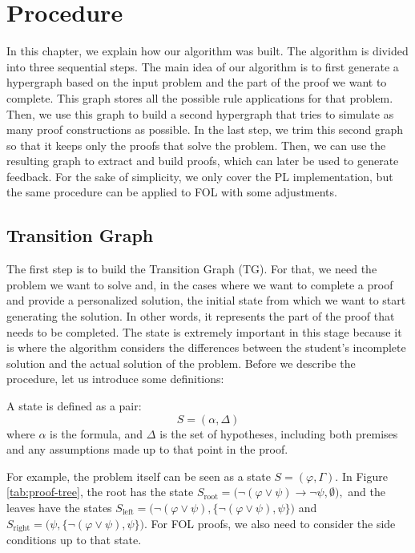 \documentclass[runningheads]{llncs}
\begin{document}
\section{Procedure}
In this chapter, we explain how our algorithm was built. The algorithm is divided into three sequential steps. 
The main idea of our algorithm is to first generate a hypergraph based on the input problem and the part of the proof we want to complete. This graph stores all the possible rule applications for that problem. Then, we use this graph to build a second hypergraph that tries to simulate as many proof constructions as possible. In the last step, we trim this second graph so that it keeps only the proofs that solve the problem. Then, we can use the resulting graph to extract and build proofs, which can later be used to generate feedback. For the sake of simplicity, we only cover the PL implementation, but the same procedure can be applied to FOL with some adjustments.

\subsection{Transition Graph}
The first step is to build the Transition Graph (TG). For that, we need the problem we want to solve and, in the cases where we want to complete a proof and provide a personalized solution, the initial state from which we want to start generating the solution. In other words, it represents the part of the proof that needs to be completed. The state is extremely important in this stage because it is where the algorithm considers the differences between the student's incomplete solution and the actual solution of the problem. Before we describe the procedure, let us introduce some definitions:

\begin{definition}[State]
A state is defined as a pair:
\[
S = (\alpha, \Delta)
\]
where \(\alpha\) is the formula, and \(\Delta\) is the set of hypotheses, including both premises and any assumptions made up to that point in the proof.
\end{definition}

For example, the problem itself can be seen as a state \(S = (\varphi, \Gamma)\). In Figure \ref{tab:proof-tree}, the root has the state \(S_{\text{root}} = \big(\neg (\varphi \lor \psi) \to \neg \psi, \emptyset \big),\) and the leaves have the states 
\( S_{\text{left}} = \big(\neg (\varphi \lor \psi), \{\neg (\varphi \lor \psi), \psi\}\big)\) and \(S_{\text{right}} = \big(\psi, \{\neg (\varphi \lor \psi), \psi\}\big)\). For FOL proofs, we also need to consider the side conditions up to that state.
\end{document}
